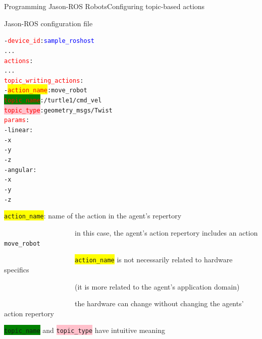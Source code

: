 \documentclass[compress]{beamer}
\newcommand{\yamlkey}[1]{\textcolor{red}{\texttt{#1}}}
\newcommand{\yamlvalue}[1]{\textcolor{blue}{\texttt{#1}}}
\begin{document}
\begin{frame}[fragile]{Programming Jason-ROS Robots}{Configuring topic-based actions}{}


\footnotesize

\begin{block}{Jason-ROS configuration file}
\vspace{-1em}

\scriptsize
\begin{alltt}\ssmall
- \yamlkey{device_id}: \yamlvalue{sample_roshost}
     ...
  \yamlkey{actions}:        
        ...
    \yamlkey{topic_writing_actions}:          
      - \colorbox{yellow}{\yamlkey{action_name}}: move_robot
        \colorbox{green}{\yamlkey{topic_name}}: /turtle1/cmd_vel
        \colorbox{pink}{\yamlkey{topic_type}}: geometry_msgs/Twist 
        \yamlkey{params}:
           - linear:
              - x
              - y
              - z
           - angular:
              - x
              - y
              - z     
\end{alltt}
\vspace{-1em}    
\end{block}  

\scriptsize

 \colorbox{yellow}{\texttt{action\_name}}: name of the action in the agent's repertory\\
 
  \vspace{-.45cm}
 

 
 \ \ \ \ \ \ \ \ \ \ \ \ \ \ \ \ \ \ \ \ {\tiny in this case, the agent's action repertory includes an action \texttt{move\_robot}}\\
 
 \vspace{-.45cm}
 
 \ \ \ \ \ \ \ \ \ \ \ \ \ \ \ \ \ \ \ \ {\tiny \colorbox{yellow}{\texttt{action\_name}} is not necessarily related to hardware specifics}\\
 
  \vspace{-.45cm}
 
 \ \ \ \ \ \ \ \ \ \ \ \ \ \ \ \ \ \ \ \ {\tiny (it is more related to the agent's application domain)}\\
 
  
  \vspace{-.45cm}
 
 \ \ \ \ \ \ \ \ \ \ \ \ \ \ \ \ \ \ \ \ {\tiny the hardware can change without changing the agents' action repertory}\\
 
 \vspace{-.3cm}
 
 \colorbox{green}{\texttt{topic\_name}} and \colorbox{pink}{\texttt{topic\_type}} have intuitive meaning

\end{frame}
\end{document}
